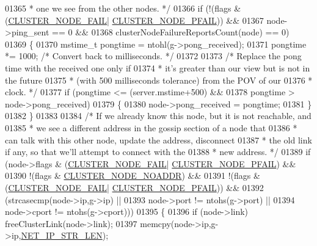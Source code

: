 \begin{DoxyCode}
{{{{{{{{{{{{{{{{{{{{01365 \textcolor{comment}{             * one we see from the other nodes. */}
01366             \textcolor{keywordflow}{if} (!(flags & (\hyperlink{cluster_8h_ad211e85c7baf8a5a59acd747e4e9005a}{CLUSTER\_NODE\_FAIL}|
      \hyperlink{cluster_8h_a5306c1ae8988b8be0a1a02bd9162dfa1}{CLUSTER\_NODE\_PFAIL})) &&
01367                 node->ping\_sent == 0 &&
01368                 clusterNodeFailureReportsCount(node) == 0)
01369             \{
01370                 mstime\_t pongtime = ntohl(g->pong\_received);
01371                 pongtime *= 1000; \textcolor{comment}{/* Convert back to milliseconds. */}
01372 
01373                 \textcolor{comment}{/* Replace the pong time with the received one only if}
01374 \textcolor{comment}{                 * it's greater than our view but is not in the future}
01375 \textcolor{comment}{                 * (with 500 milliseconds tolerance) from the POV of our}
01376 \textcolor{comment}{                 * clock. */}
01377                 \textcolor{keywordflow}{if} (pongtime <= (server.mstime+500) &&
01378                     pongtime > node->pong\_received)
01379                 \{
01380                     node->pong\_received = pongtime;
01381                 \}
01382             \}
01383 
01384             \textcolor{comment}{/* If we already know this node, but it is not reachable, and}
01385 \textcolor{comment}{             * we see a different address in the gossip section of a node that}
01386 \textcolor{comment}{             * can talk with this other node, update the address, disconnect}
01387 \textcolor{comment}{             * the old link if any, so that we'll attempt to connect with the}
01388 \textcolor{comment}{             * new address. */}
01389             \textcolor{keywordflow}{if} (node->flags & (\hyperlink{cluster_8h_ad211e85c7baf8a5a59acd747e4e9005a}{CLUSTER\_NODE\_FAIL}|
      \hyperlink{cluster_8h_a5306c1ae8988b8be0a1a02bd9162dfa1}{CLUSTER\_NODE\_PFAIL}) &&
01390                 !(flags & \hyperlink{cluster_8h_a2bbed8bf0615871a01ca8b7f691b56d8}{CLUSTER\_NODE\_NOADDR}) &&
01391                 !(flags & (\hyperlink{cluster_8h_ad211e85c7baf8a5a59acd747e4e9005a}{CLUSTER\_NODE\_FAIL}|
      \hyperlink{cluster_8h_a5306c1ae8988b8be0a1a02bd9162dfa1}{CLUSTER\_NODE\_PFAIL})) &&
01392                 (strcasecmp(node->ip,g->ip) ||
01393                  node->port != ntohs(g->port) ||
01394                  node->cport != ntohs(g->cport)))
01395             \{
01396                 \textcolor{keywordflow}{if} (node->link) freeClusterLink(node->link);
01397                 memcpy(node->ip,g->ip,\hyperlink{server_8h_ad97c5405ed22a94e9fcc10fba577d6c0}{NET\_IP\_STR\_LEN});
}}}}}}}}}}}}}}}}}}}}
\end{DoxyCode}
